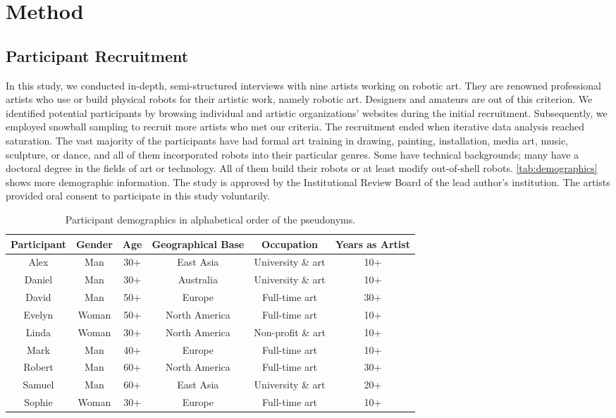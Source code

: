 \section{Method}

\subsection{Participant Recruitment}

In this study, we conducted in-depth, semi-structured interviews with nine artists working on robotic art. They are renowned professional artists who use or build physical robots for their artistic work, namely robotic art. Designers and amateurs are out of this criterion. We identified potential participants by browsing individual and artistic organizations' websites during the initial recruitment. Subsequently, we employed snowball sampling to recruit more artists who met our criteria. The recruitment ended when iterative data analysis reached saturation. The vast majority of the participants have had formal art training in drawing, painting, installation, media art, music, sculpture, or dance, and all of them incorporated robots into their particular genres. Some have technical backgrounds; many have a doctoral degree in the fields of art or technology. All of them build their robots or at least modify out-of-shell robots. \autoref{tab:demographics} shows more demographic information. 
The study is approved by the Institutional Review Board of the lead author's institution. The artists provided oral consent to participate in this study voluntarily.

\begin{table*}[htbp]
\centering
\begin{tabular}{c c c c c c}
\toprule
Participant & Gender & Age & Geographical Base & Occupation & Years as Artist \\
\midrule
Alex & Man & 30+ & East Asia & University \& art & 10+ \\
Daniel & Man & 30+ & Australia & University \& art & 10+ \\
David & Man & 50+ & Europe & Full-time art & 30+ \\
Evelyn & Woman & 50+ & North America & Full-time art & 10+ \\
Linda & Woman & 30+ & North America & Non-profit \& art & 10+ \\
Mark & Man & 40+ & Europe & Full-time art & 10+ \\
Robert & Man & 60+ & North America & Full-time art & 30+ \\
Samuel & Man & 60+ & East Asia & University \& art & 20+ \\
Sophie & Woman & 30+ & Europe & Full-time art & 10+ \\
\bottomrule
\end{tabular}
\caption{Participant demographics in alphabetical order of the pseudonyms.}
\label{tab:demographics}
\end{table*}

